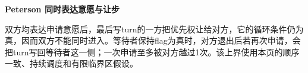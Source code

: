 {\color{ink}\bfseries Peterson 同时表达意愿与让步}\par\vspace{1bp}双方均表达申请意愿后，最后写turn的一方把优先权让给对方，它的循环条件仍为真，因而双方不能同时进入。等待者保持flag为真时，对方退出后若再次申请，会把turn写回等待者这一侧；一次申请至多被对方越过1次。该上界使用本页的顺序一致、持续调度和有限临界区假设。
